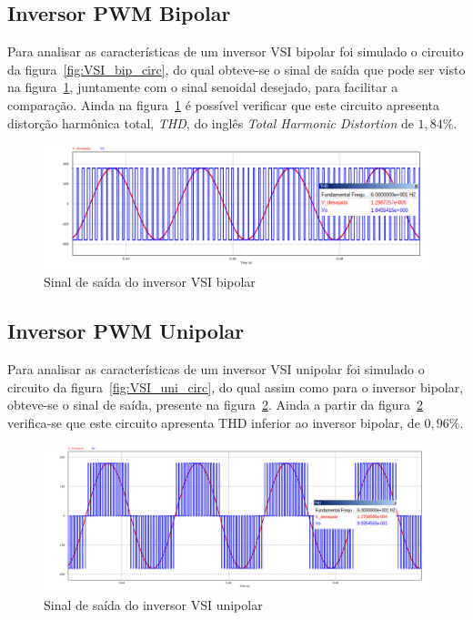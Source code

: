 \documentclass[
	12pt,				%
	openany,
	onseside,
	a4paper,			%
	english,			%
	french,				%
	spanish,			%
	brazil,				%
	]{abntex2}
\begin{document}
\subsection{Inversor PWM Bipolar}

Para analisar as características de um inversor VSI bipolar foi simulado o circuito da figura~\ref{fig:VSI_bip_circ}, do qual obteve-se o sinal de saída que pode ser visto na figura~\ref{fig:response_vsi_bip}, juntamente com o sinal senoidal desejado, para facilitar a comparação. Ainda na figura~\ref{fig:response_vsi_bip} é possível verificar que este circuito apresenta distorção harmônica total, \emph{THD}, do inglês \textit{Total Harmonic Distortion} de $1,84\%$.

\begin{figure}[htbp]%
	\centering
		\includegraphics[width= \linewidth]{vsi_bip_out}
		\caption{Sinal de saída do inversor VSI bipolar}
		\label{fig:response_vsi_bip}
\end{figure}

\subsection{Inversor PWM Unipolar}

Para analisar as características de um inversor VSI unipolar foi simulado o circuito da figura~\ref{fig:VSI_uni_circ}, do qual assim como para o inversor bipolar, obteve-se o sinal de saída, presente na figura~\ref{fig:response_vsi_uni}. Ainda a partir da figura~\ref{fig:response_vsi_uni} verifica-se que este circuito apresenta THD inferior ao inversor bipolar, de $0,96\%$.

\begin{figure}[H]%
	\centering
		\includegraphics[width= \linewidth]{vsi_uni_out}
		\caption{Sinal de saída do inversor VSI unipolar}
		\label{fig:response_vsi_uni}
\end{figure}
\end{document}
